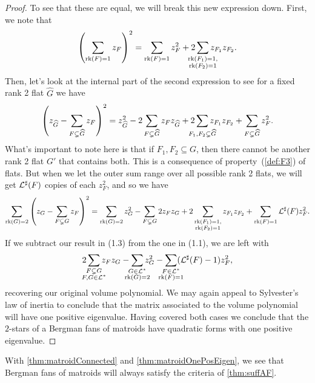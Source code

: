 \documentclass[12pt,oneside]{../../sfsuthesis}
\begin{document}
\begin{proof}
    To see that these are equal, we will break this new expression down.
    First, we note that
    \begin{equation}
        \left( \sum_{\rk(F) = 1} z_F\right)^2 = \sum_{\rk(F) = 1} z_F^2 + 2\sum_{\mathclap{\substack{\rk(F_1) = 1, \\ \rk(F_2) = 1}}} z_{F_1}z_{F_2}.
    \end{equation}
    Then, let's look at the internal part of the second expression to see for a fixed rank 2 flat \( \hat{G} \) we have
    \begin{equation}
        \left( z_{\hat{G}} - \sum_{F \subsetneq {\hat{G}}} z_F \right)^2
        = z_{\hat{G}}^2 - 2\sum_{F \subsetneq \hat{G}} z_F z_{\hat{G}} + 2\sum_{\mathclap{F_1,F_2 \subsetneq \hat{G}}}z_{F_1} z_{F_2} + \sum_{F \subsetneq \hat{G}} z_F^2.
    \end{equation}
    What's important to note here is that if \( F_1, F_2 \subseteq G \), then there cannot be another rank 2 flat \( G' \) that contains both.
    This is a consequence of property~(\ref{def:F3}) of flats.
    But when we let the outer sum range over all possible rank 2 flats, we will get \( \mathcal{L}^\sharp(F) \) copies of each \( z_F^2 \), and so we have
    \begin{equation}
        \sum_{\operatorname{rk}(G) = 2} \left( z_G - \sum_{F \subsetneq G} z_F\right)^2 =
        \sum_{\operatorname{rk}(G)=2}z_G^2
        - \sum_{F \subsetneq G}2 z_F z_{G}
        + 2\sum_{\substack{\operatorname{rk}(F_1) = 1, \\ \operatorname{rk}(F_2) = 1}}z_{F_1} z_{F_2}
        + \sum_{\operatorname{rk}(F) = 1} \mathcal{L}^\sharp(F)z_F^2.
    \end{equation}
    If we subtract our result in (1.3) from the one in (1.1), we are left with
    \[
        2\sum_{\mathclap{\substack{F \subsetneq G \\ F,G \in \cL^\ast}}} z_F z_G - \sum_{\mathclap{\substack{G \in \cL^\ast \\ \rk(G)=2}}} z_G^2 - \sum_{\mathclap{\substack{F \in \cL^\ast \\ \rk(F)=1}}}(\cL^\sharp(F) - 1)z_F^2,
    \]
    recovering our original volume polynomial.
    We may again appeal to Sylvester's law of inertia to conclude that the matrix associated to the volume polynomial will have one positive eigenvalue.
    Having covered both cases we conclude that the \( 2 \)-stars of a Bergman fans of matroids have quadratic forms with one positive eigenvalue.

\end{proof}

With \th\ref{thm:matroidConnected} and \th\ref{thm:matroidOnePosEigen}, we see that Bergman fans of matroids will always satisfy the criteria of \th\ref{thm:suffAF}.
\end{document}
